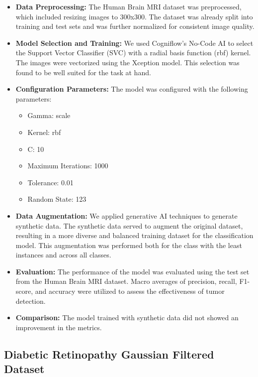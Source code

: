 \begin{itemize}
    \item \textbf{Data Preprocessing:} The Human Brain MRI dataset was preprocessed, which included resizing images to 300x300. The dataset was already split into training and test sets and was further normalized for consistent image quality.

    \item \textbf{Model Selection and Training:} We used Cogniflow's No-Code AI to select the Support Vector Classifier (SVC) with a radial basis function (rbf) kernel. The images were vectorized using the Xception model. This selection was found to be well suited for the task at hand. 

    \item \textbf{Configuration Parameters:} The model was configured with the following parameters:
    \begin{itemize}
        \item Gamma: scale
        \item Kernel: rbf
        \item C: 10
        \item Maximum Iterations: 1000
        \item Tolerance: 0.01
        \item Random State: 123
    \end{itemize}
    
    \item \textbf{Data Augmentation:} We applied generative AI techniques to generate synthetic data. The synthetic data served to augment the original dataset, resulting in a more diverse and balanced training dataset for the classification model. This augmentation was performed both for the class with the least instances and across all classes.
    
    \item \textbf{Evaluation:} The performance of the model was evaluated using the test set from the Human Brain MRI dataset. Macro averages of precision, recall, F1-score, and accuracy were utilized to assess the effectiveness of tumor detection.
    
    \item \textbf{Comparison:} The model trained with synthetic data did not showed an improvement in the metrics.
    

\end{itemize}

\subsection{Diabetic Retinopathy Gaussian Filtered Dataset}
\label{app:technical_details_retinopathy}

